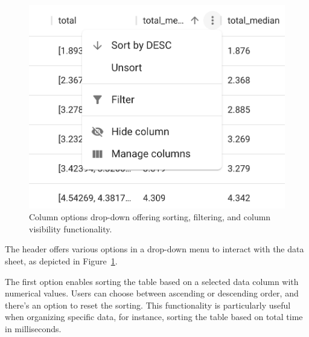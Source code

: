 \begin{figure}[h]
  \centering
  \includegraphics[width=0.4\linewidth]{figures/data-viewer-header-options.png}
  \caption{Column options drop-down offering sorting, filtering, and column visibility functionality.}
  \label{fig:data-viewer-options}
\end{figure}

The header offers various options in a drop-down menu to interact with the data sheet, as depicted in Figure~\ref{fig:data-viewer-options}.

The first option enables sorting the table based on a selected data column with numerical values. Users can choose between ascending or descending order, and there's an option to reset the sorting. This functionality is particularly useful when organizing specific data, for instance, sorting the table based on total time in milliseconds.

